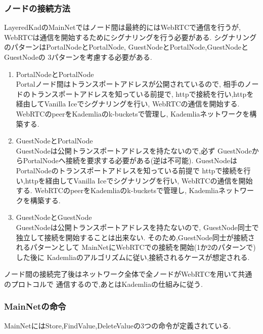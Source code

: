 \documentclass[sotsuron]{jcsie}
\begin{document}
\subsubsection{ノードの接続方法}
LayeredKadのMainNetではノード間は最終的にはWebRTCで通信を行うが,
WebRTCは通信を開始するためにシグナリングを行う必要がある.
シグナリングのパターンはPortalNodeとPortalNode,
GuestNodeとPortalNode,GuestNodeとGuestNodeの
3パターンを考慮する必要がある.

\begin{enumerate}
	\item {PortalNodeとPortalNode}\\
	Portalノード間はトランスポートアドレスが公開されているので,
	相手のノードのトランスポートアドレスを知っている前提で,
	httpで接続を行い,httpを経由してVanilla Iceでシグナリングを行い,
	WebRTCの通信を開始する.
	WebRTCのpeerをKademliaのk-bucketsで管理し,
	Kademliaネットワークを構築する.
	\\
	\item {GuestNodeとPortalNode}\\
	GuestNodeは公開トランスポートアドレスを持たないので,必ず
	GuestNodeからPortalNodeへ接続を要求する必要がある(逆は不可能).
	GuestNodeはPortalNodeのトランスポートアドレスを知っている前提で
	httpで接続を行い,httpを経由してVanilla Iceでシグナリングを行い,
	WebRTCの通信を開始する.
	WebRTCのpeerをKademliaのk-bucketsで管理し,
	Kademliaネットワークを構築する.
	\\
	\item {GuestNodeとGuestNode}\\
	GuestNodeは公開トランスポートアドレスを持たないので,
	GuestNode同士で独立して接続を開始することは出来ない.
	そのため,GuestNode同士が接続されるパターンとして
	MainNetにWebRTCでの接続を開始(1か2のパターンで)した後に
	Kademliaのアルゴリズムに従い,接続されるケースが想定される.
\end{enumerate}

ノード間の接続完了後はネットワーク全体で全ノードがWebRTCを用いて共通のプロトコルで
通信するので,あとはKademliaの仕組みに従う.

\subsubsection{MainNetの命令}
MainNetにはStore,FindValue,DeleteValueの3つの命令が定義されている.
\end{document}
